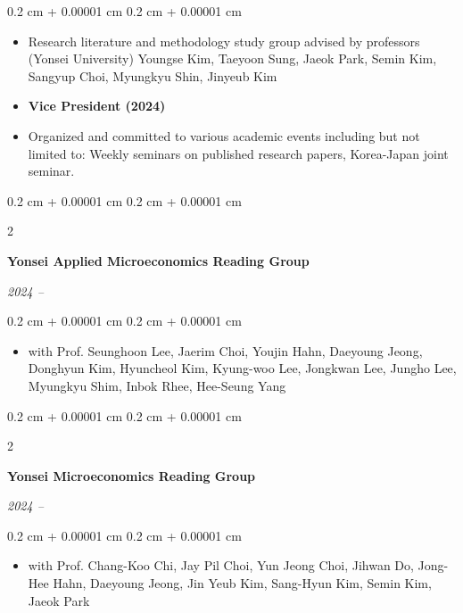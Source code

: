 \documentclass[10pt, letterpaper]{article}
\newenvironment{highlights}{
	\begin{itemize}[
		topsep=0.10 cm,
		parsep=0.10 cm,
		partopsep=0pt,
		itemsep=0pt,
		leftmargin=0.4 cm + 10pt
		]
	}{
	\end{itemize}
} %
\newenvironment{onecolentry}{
	\begin{adjustwidth}{
			0.2 cm + 0.00001 cm
		}{
			0.2 cm + 0.00001 cm
		}
	}{
	\end{adjustwidth}
} %
\newenvironment{twocolentry}[2][]{
	\onecolentry
	\def\secondColumn{#2}
	\setcolumnwidth{\fill, 4.5 cm}
	\begin{paracol}{2}
	}{
		\switchcolumn \raggedleft \secondColumn
	\end{paracol}
	\endonecolentry
} %
\begin{document}
	\vspace{0.10 cm}
	\begin{onecolentry}
	\begin{highlights}
		\item Research literature and methodology study group advised by professors (Yonsei University) Youngse Kim, Taeyoon Sung, Jaeok Park, Semin Kim, Sangyup Choi, Myungkyu Shin, Jinyeub Kim
		\item \textbf{Vice President (2024)}
		\item Organized and committed to various academic events including but not limited to: Weekly seminars on published research papers, Korea-Japan
		joint seminar.
	\end{highlights}
\end{onecolentry}
	
	
	\vspace{0.2 cm}
	
	\begin{twocolentry}{
			
			
			\textit{2024 –}}
		\textbf{Yonsei Applied Microeconomics Reading Group}
	\end{twocolentry}
	
	\vspace{0.10 cm}
	\begin{onecolentry}
		\begin{highlights}
\item with Prof. Seunghoon Lee, Jaerim Choi, Youjin Hahn, Daeyoung Jeong, Donghyun Kim, Hyuncheol Kim, Kyung-woo Lee, Jongkwan Lee, Jungho Lee, Myungkyu Shim, Inbok Rhee, Hee-Seung Yang
		\end{highlights}
	\end{onecolentry}
	
		\vspace{0.2 cm}
	
	
	\begin{twocolentry}{
			
			
			\textit{2024 –}}
		\textbf{Yonsei Microeconomics Reading Group}
	\end{twocolentry}
	
	\vspace{0.10 cm}
	\begin{onecolentry}
		\begin{highlights}
			\item with Prof. Chang-Koo Chi, Jay Pil Choi, Yun Jeong Choi, Jihwan Do, Jong-Hee Hahn, Daeyoung Jeong, Jin Yeub Kim, Sang-Hyun Kim, Semin Kim, Jaeok Park
		\end{highlights}
	\end{onecolentry}
	
\end{document}
